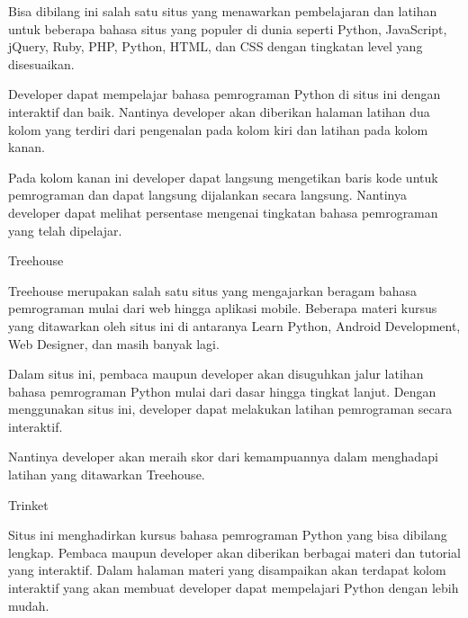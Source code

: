 \noindent 
{\fontsize{14pt}{14pt}\selectfont Bisa dibilang ini salah satu situs yang menawarkan pembelajaran dan latihan untuk beberapa bahasa situs yang populer di dunia seperti Python, JavaScript, jQuery, Ruby, PHP, Python, HTML, dan CSS dengan tingkatan level yang disesuaikan. \\} \par
\noindent 
{\fontsize{14pt}{14pt}\selectfont Developer dapat mempelajar bahasa pemrograman Python di situs ini dengan interaktif dan baik. Nantinya developer akan diberikan halaman latihan dua kolom yang terdiri dari pengenalan pada kolom kiri dan latihan pada kolom kanan. \\} \par
\noindent 
{\fontsize{14pt}{14pt}\selectfont Pada kolom kanan ini developer dapat langsung mengetikan baris kode untuk pemrograman dan dapat langsung dijalankan secara langsung. Nantinya developer dapat melihat persentase mengenai tingkatan bahasa pemrograman yang telah dipelajar. \\} \par
\noindent 
{\fontsize{14pt}{14pt}\selectfont Treehouse \\} \par
\noindent 
{\fontsize{14pt}{14pt}\selectfont Treehouse merupakan salah satu situs yang mengajarkan beragam bahasa pemrograman mulai dari web hingga aplikasi mobile. Beberapa materi kursus yang ditawarkan oleh situs ini di antaranya Learn Python, Android Development, Web Designer, dan masih banyak lagi. \\} \par
\noindent 
{\fontsize{14pt}{14pt}\selectfont Dalam situs ini, pembaca maupun developer akan disuguhkan jalur latihan bahasa pemrograman Python mulai dari dasar hingga tingkat lanjut. Dengan menggunakan situs ini, developer dapat melakukan latihan pemrograman secara interaktif. \\} \par
\noindent 
{\fontsize{14pt}{14pt}\selectfont Nantinya developer akan meraih skor dari kemampuannya dalam menghadapi latihan yang ditawarkan Treehouse. \\} \par
\noindent 
{\fontsize{14pt}{14pt}\selectfont Trinket \\} \par
\noindent 
{\fontsize{14pt}{14pt}\selectfont Situs ini menghadirkan kursus bahasa pemrograman Python yang bisa dibilang lengkap.  $  $Pembaca maupun developer akan diberikan berbagai materi dan tutorial yang interaktif. Dalam halaman materi yang disampaikan akan terdapat kolom interaktif yang akan membuat developer dapat mempelajari Python dengan lebih mudah. \\} \par
